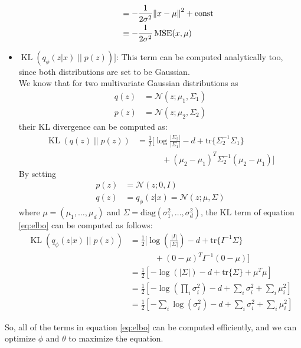 \documentclass{article}
\newcommand{\kl}[2]{\operatorname{KL}({#1} \; || \; {#2})}
\begin{document}
\begin{itemize}
\begin{itemize}
\begin{equation}
\begin{alignedat}{6}
						\span \span &&& = - {\frac {1}{2 \sigma^2}} {\Vert x - \mu \Vert}^2 + \text{const} \\
						\span \span &&& \equiv - {\frac {1}{2 \sigma^2}} \, \text{MSE}(x, \mu)
					\end{alignedat}
				\end{equation}
		\end{itemize}
	\item $\kl{q_\phi(z|x)}{p(z)}]$:
		This term can be computed analytically too, since both distributions are set to be Gaussian. \\
		We know that for two multivariate Gaussian distributions as
		\begin{equation}
			\begin{alignedat}{2}
				q(z) &= \mathcal{N}(z; \mu_1, \Sigma_1)  \\
				p(z) &= \mathcal{N}(z; \mu_2, \Sigma_2)
			\end{alignedat}
		\end{equation}
		their KL divergence can be computed as:
		\begin{equation}
			\begin{alignedat}{2}
				\kl{q(z)}{p(z)} &= \frac{1}{2} \biggl[ \log\frac{|\Sigma_2|}{|\Sigma_1|} - d + \text{tr} \{ \Sigma_2^{-1}\Sigma_1 \} \\
				& \qquad \quad  + (\mu_2 - \mu_1)^T \Sigma_2^{-1}(\mu_2 - \mu_1) \biggr]
			\end{alignedat}
		\end{equation}
		By setting
		\begin{equation}
			\begin{alignedat}{2}
				p(z) &= \mathcal{N}(z; 0, I) \\
				q(z) &= q_\phi(z|x) = \mathcal{N}(z; \mu, \Sigma)
			\end{alignedat}
		\end{equation}		
		where $\mu = (\mu_1, \dots, \mu_d)$ and $\Sigma = \text{diag}(\sigma_1^2, \dots, \sigma_d^2)$, the KL term of equation \ref{eq:elbo} can be computed as follows:
		\begin{equation}
			\begin{alignedat}{2}
				\kl{q_\phi(z|x)}{p(z)} & = \frac{1}{2} \biggl[ \log(\frac{|I|}{|\Sigma|}) - d + \text{tr} \{ I^{-1}\Sigma \} \\
				& \qquad \quad + (0 - \mu)^T I^{-1}(0 - \mu) \biggr] \\
                & = \frac{1}{2}\left[-\log({|\Sigma|}) - d + \text{tr} \{ \Sigma \} + \mu^T \mu\right] \\
                & = \frac{1}{2}\left[-\log(\prod_i\sigma_i^2) - d + \sum_i\sigma_i^2 + \sum_i\mu^2_i\right] \\
                & = \frac{1}{2}\left[-\sum_i\log(\sigma_i^2) - d + \sum_i\sigma_i^2 + \sum_i\mu^2_i\right]
			\end{alignedat}
		\end{equation}
\end{itemize}
So, all of the terms in equation \ref{eq:elbo} can be computed efficiently, and we can optimize $\phi$ and $\theta$ to maximize the equation.
\end{document}

